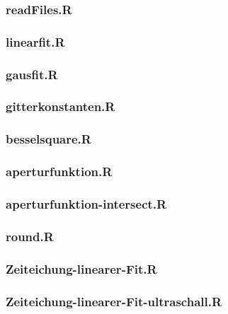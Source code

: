 \documentclass[12pt]{article}
\begin{document}
\subsubsection{readFiles.R}\label{readFiles}

\subsubsection{linearfit.R}\label{linearfit}

\subsubsection{gausfit.R}\label{gausfit}

\subsubsection{gitterkonstanten.R}\label{gitterkonstanten}

\subsubsection{besselsquare.R}\label{besselsquare}

\subsubsection{aperturfunktion.R}\label{aperturfunktion}

\subsubsection{aperturfunktion-intersect.R}\label{aperturfunktion-intersect}

\subsubsection{round.R}\label{round}

\subsubsection{Zeiteichung-linearer-Fit.R}\label{Zeiteichung}

\subsubsection{Zeiteichung-linearer-Fit-ultraschall.R}\label{Zeiteichung-ultraschall}

\end{document}
